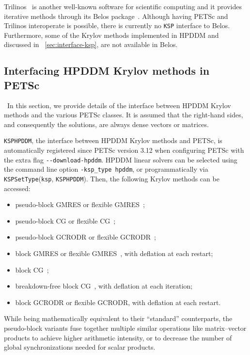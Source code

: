\documentclass[3p,11pt]{elsarticle}
\newcommand{\pk}[1]{\texttt{#1}}
\begin{document}
Trilinos~\cite{heroux2005overview} is another well-known software for scientific
computing and it provides iterative methods through its Belos package~\cite{bavier2012amesos2}.
Although having PETSc and
Trilinos interoperate is possible, there is currently no \pk{KSP} interface to Belos. %
Furthermore, some of the Krylov methods implemented in
HPDDM and discussed in ~\cref{sec:interface-ksp}, are not available in Belos.

  \subsection{Interfacing HPDDM Krylov methods in PETSc\label{sec:interface-ksp}}\
In this section, we provide details of the
interface between HPDDM Krylov methods and the various PETSc
classes. It is assumed that the right-hand sides, and
consequently the solutions, are always dense vectors or matrices.

\pk{KSPHPDDM}, the interface between HPDDM Krylov methods and PETSc, is
automatically registered since PETSc version 3.12 when configuring PETSc with
the extra flag \pk{-{}-download-hpddm}.  HPDDM linear solvers can be selected
using the command line option \pk{-ksp\_type hpddm}, or programmatically via
\pk{KSPSetType}(\pk{ksp}, \pk{KSPHPDDM}). Then, the following Krylov methods
can be accessed:
\begin{itemize}
    \item pseudo-block GMRES or flexible GMRES~\cite{saad1993flexible};
    \item pseudo-block CG or flexible CG~\cite{notay2000flexible};
    \item pseudo-block GCRODR or flexible GCRODR~\cite{carvalho2011flexible};
    \item block GMRES or flexible GMRES~\cite{calandra2012flexible}, with deflation at each restart;
    \item block CG~\cite{o1980block};
    \item breakdown-free block CG~\cite{ji2017breakdown}, with deflation at each iteration;
    \item block GCRODR or flexible GCRODR, with deflation at each restart.
\end{itemize}
While being mathematically equivalent to
their ``standard'' counterparts, the pseudo-block variants fuse together multiple similar
operations like matrix--vector
products to achieve higher arithmetic intensity, or to decrease the
number of global synchronizations needed for scalar products.
\end{document}
